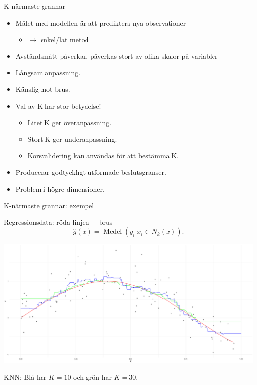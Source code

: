 \documentclass[10pt,english]{beamer}
\begin{document}
\begin{frame}{K-närmaste grannar}

    \begin{itemize}
        \item Målet med modellen är att prediktera nya observationer 
        \begin{itemize}
          \item $\rightarrow$ enkel/lat metod
        \end{itemize}
        \item Avståndsmått påverkar, påverkas stort av olika skalor på variabler
        \item Långsam anpassning.
        \item Känslig mot brus.
        \item Val av K har stor betydelse!
        \begin{itemize}
            \item Litet K ger överanpassning.
            \item Stort K ger underanpassning.
            \item Korsvalidering kan användas för att bestämma K.
        \end{itemize}
        \item Producerar godtyckligt utformade beslutsgränser.
        \item Problem i högre dimensioner.
    \end{itemize}
    
\end{frame}


\begin{frame}{K-närmaste grannar: exempel}

    Regressionsdata: röda linjen + brus
    \begin{equation*}
        \hat{g}(x) = \operatorname{Medel}(y_i | x_i \in N_k(x)).
    \end{equation*}

    \includegraphics[width=\textwidth]{fig/knnreg.png}

    KNN: Blå har $K=10$ och grön har $K=30$.
\end{frame}
\end{document}

